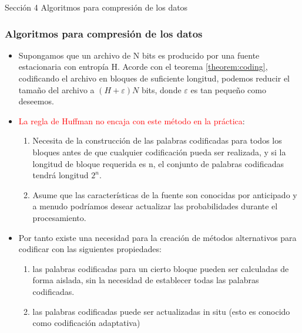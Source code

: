 \documentclass{beamer}
\theoremstyle{plain}
\theoremstyle{example}
\theoremstyle{example}
\begin{document}
\begin{frame}   \footnotesize
{
\begin{block}{Sección 4}
Algoritmos para compresión de los datos
\end{block}
}
\end{frame} 



\begin{frame}  \frametitle{Algoritmos para compresión de los datos}\footnotesize 

\begin{itemize}
\item Supongamos que un archivo de N bits es producido por una fuente estacionaria con entropía H. Acorde con el teorema \ref{theorem:coding}, codificando el archivo en bloques de suficiente longitud, podemos reducir el tamaño del archivo a $(H + \varepsilon) N$ bits, donde $\varepsilon$ es tan pequeño como deseemos. 

\item \textcolor{red}{La regla de Huffman no encaja con este método en la práctica}: 

\begin{enumerate}\footnotesize 
\item Necesita de la construcción de las palabras codificadas para todos los bloques antes de que cualquier codificación pueda ser realizada, y si la longitud de bloque requerida es n, el conjunto de palabras codificadas tendrá longitud $2^n$.
\item Asume que las características de la fuente son conocidas por anticipado y a menudo podríamos desear actualizar las probabilidades durante el procesamiento.
\end{enumerate}


\item Por tanto existe una necesidad para la creación de métodos alternativos para codificar con las siguientes propiedades:

\begin{enumerate}\footnotesize 
\item las palabras codificadas para un cierto bloque pueden ser calculadas de forma aislada, sin la necesidad de establecer todas las palabras codificadas.
\item las palabras codificadas puede ser actualizadas in situ (esto es conocido como codificación adaptativa)
\end{enumerate}

\end{itemize}





\end{frame} 
\end{document}
